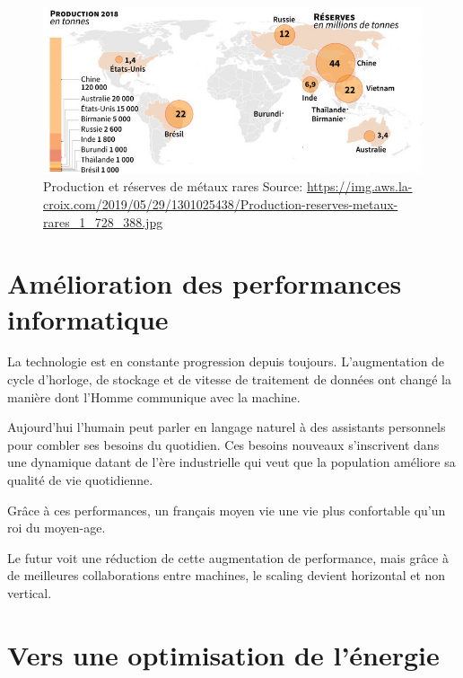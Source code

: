 \begin{figure}
  \centering
  \includegraphics[scale=0.5]{media/terres_rares.jpg}
  \caption{
    Production et réserves de métaux rares\newline
      \tiny{Source:\newline
        \url{https://img.aws.la-croix.com/2019/05/29/1301025438/Production-reserves-metaux-rares_1_728_388.jpg}
      }
  }
  \label{fig:terre_rare}
\end{figure}

\section{Amélioration des performances informatique}

La technologie est en constante progression depuis toujours.
L'augmentation de cycle d'horloge, de stockage et de vitesse de traitement de données
ont changé la manière dont l'Homme communique avec la machine.

Aujourd'hui l'humain peut parler en langage naturel à des assistants personnels pour combler ses
besoins du quotidien.
Ces besoins nouveaux s'inscrivent dans une dynamique datant de l'ère industrielle qui veut que
la population améliore sa qualité de vie quotidienne.

Grâce à ces performances, un français moyen vie une vie plus confortable qu'un roi
du moyen-age.

Le futur voit une réduction de cette augmentation de performance, mais grâce à de meilleures collaborations
entre machines, le scaling devient horizontal et non vertical.



\section{Vers une optimisation de l'énergie}

